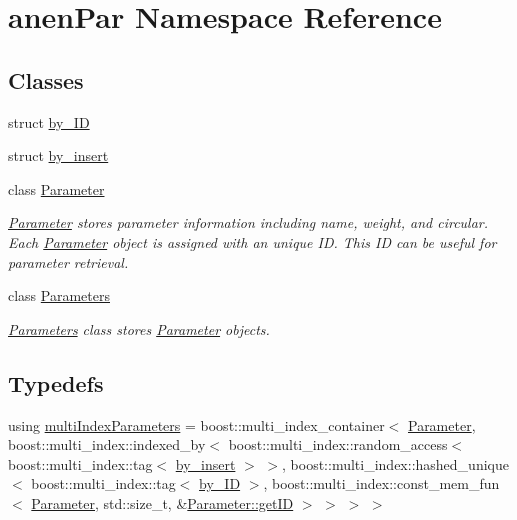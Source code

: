 \hypertarget{namespaceanen_par}{}\section{anen\+Par Namespace Reference}
\label{namespaceanen_par}
\subsection*{Classes}
\begin{DoxyCompactItemize}
\item 
struct \mbox{\hyperlink{structanen_par_1_1by___i_d}{by\+\_\+\+ID}}
\item 
struct \mbox{\hyperlink{structanen_par_1_1by__insert}{by\+\_\+insert}}
\item 
class \mbox{\hyperlink{classanen_par_1_1_parameter}{Parameter}}
\begin{DoxyCompactList}\small\item\em \mbox{\hyperlink{classanen_par_1_1_parameter}{Parameter}} stores parameter information including name, weight, and circular. Each \mbox{\hyperlink{classanen_par_1_1_parameter}{Parameter}} object is assigned with an unique ID. This ID can be useful for parameter retrieval. \end{DoxyCompactList}\item 
class \mbox{\hyperlink{classanen_par_1_1_parameters}{Parameters}}
\begin{DoxyCompactList}\small\item\em \mbox{\hyperlink{classanen_par_1_1_parameters}{Parameters}} class stores \mbox{\hyperlink{classanen_par_1_1_parameter}{Parameter}} objects. \end{DoxyCompactList}\end{DoxyCompactItemize}
\subsection*{Typedefs}
\begin{DoxyCompactItemize}
\item 
using \mbox{\hyperlink{namespaceanen_par_a80347e56535f3553dead0c9515dbecd6}{multi\+Index\+Parameters}} = boost\+::multi\+\_\+index\+\_\+container$<$ \mbox{\hyperlink{classanen_par_1_1_parameter}{Parameter}}, boost\+::multi\+\_\+index\+::indexed\+\_\+by$<$ boost\+::multi\+\_\+index\+::random\+\_\+access$<$ boost\+::multi\+\_\+index\+::tag$<$ \mbox{\hyperlink{structanen_par_1_1by__insert}{by\+\_\+insert}} $>$ $>$, boost\+::multi\+\_\+index\+::hashed\+\_\+unique$<$ boost\+::multi\+\_\+index\+::tag$<$ \mbox{\hyperlink{structanen_par_1_1by___i_d}{by\+\_\+\+ID}} $>$, boost\+::multi\+\_\+index\+::const\+\_\+mem\+\_\+fun$<$ \mbox{\hyperlink{classanen_par_1_1_parameter}{Parameter}}, std\+::size\+\_\+t, \&\mbox{\hyperlink{classanen_par_1_1_parameter_a5d98f6099de9e07686f44026a6926038}{Parameter\+::get\+ID}} $>$ $>$ $>$ $>$
\end{DoxyCompactItemize}
